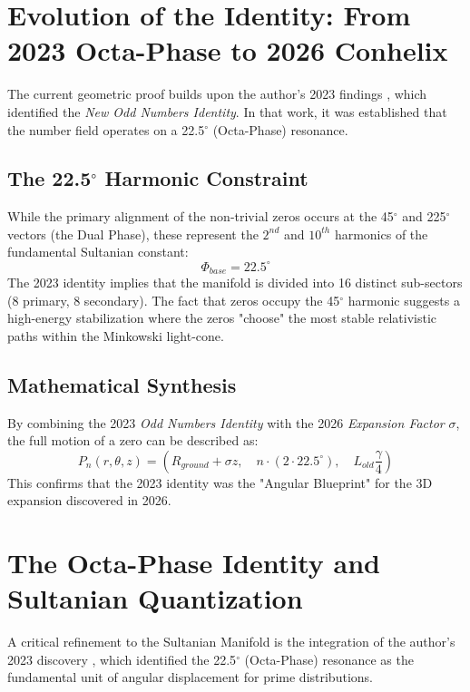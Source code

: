 \documentclass[11pt,a4paper]{article}
\begin{document}
\section{Evolution of the Identity: From 2023 Octa-Phase to 2026 Conhelix}
The current geometric proof builds upon the author's 2023 findings \cite{Soltan2023}, which identified the \textit{New Odd Numbers Identity}. In that work, it was established that the number field operates on a 22.5$^\circ$ (Octa-Phase) resonance.

\subsection{The 22.5$^\circ$ Harmonic Constraint}
While the primary alignment of the non-trivial zeros occurs at the 45$^\circ$ and 225$^\circ$ vectors (the Dual Phase), these represent the $2^{nd}$ and $10^{th}$ harmonics of the fundamental Sultanian constant:
\begin{equation}
    \Phi_{base} = 22.5^\circ
\end{equation}
The 2023 identity implies that the manifold is divided into 16 distinct sub-sectors (8 primary, 8 secondary). The fact that zeros occupy the 45$^\circ$ harmonic suggests a high-energy stabilization where the zeros "choose" the most stable relativistic paths within the Minkowski light-cone.

\subsection{Mathematical Synthesis}
By combining the 2023 \textit{Odd Numbers Identity} with the 2026 \textit{Expansion Factor} $\sigma$, the full motion of a zero can be described as:
\begin{equation}
    P_n(r, \theta, z) = \left( R_{ground} + \sigma z, \quad n \cdot (2 \cdot 22.5^\circ), \quad L_{old} \frac{\gamma}{4} \right)
\end{equation}
This confirms that the 2023 identity was the "Angular Blueprint" for the 3D expansion discovered in 2026.

\section{The Octa-Phase Identity and Sultanian Quantization}
A critical refinement to the Sultanian Manifold is the integration of the author's 2023 discovery \cite{Soltan2023}, which identified the 22.5$^\circ$ (Octa-Phase) resonance as the fundamental unit of angular displacement for prime distributions.
\end{document}
